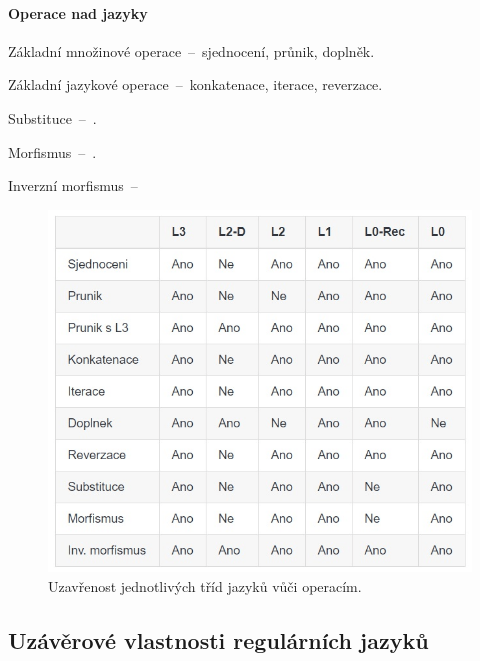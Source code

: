 \paragraph*{Operace nad jazyky} \begin{compactitem}
    \item Základní množinové operace~--~sjednocení, průnik, doplněk.

    \item Základní jazykové operace~--~konkatenace, iterace, reverzace.

    \item Substituce~--~.

    \item Morfismus~--~.

    \item Inverzní morfismus~--~
\end{compactitem}

\begin{figure}[H]
    \centering
    \includegraphics[width=1\linewidth]{uzavrenost_jazyku.png}
    \caption{Uzavřenost jednotlivých tříd jazyků vůči operacím.}
\end{figure}

\subsection{Uzávěrové vlastnosti regulárních jazyků}

